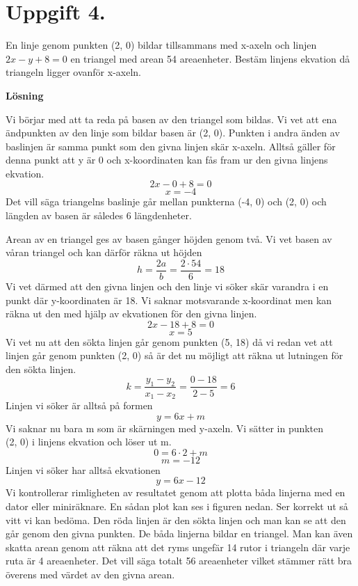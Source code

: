 \documentclass[fleqn]{article}
\begin{document}
\newpage
\section*{Uppgift 4.}
En linje genom punkten (2, 0) bildar tillsammans med x-axeln och linjen\\
 $2x-y+8=0$ en triangel med arean 54 areaenheter. Bestäm linjens ekvation då triangeln ligger ovanför x-axeln.

\textbf{Lösning}

Vi börjar med att ta reda på basen av den triangel som bildas. Vi vet att ena ändpunkten av den linje som bildar basen är (2, 0). Punkten i andra änden av baslinjen är samma punkt som den givna linjen skär x-axeln. Alltså gäller för denna punkt att y är 0 och x-koordinaten kan fås fram ur den givna linjens ekvation.
\[
2x - 0 + 8 = 0
\]
\[
x = -4
\]
Det vill säga triangelns baslinje går mellan punkterna (-4, 0) och (2, 0) och längden av basen är således 6 längdenheter.

Arean av en triangel ges av basen gånger höjden genom två. Vi vet basen av våran triangel och kan därför räkna ut höjden
\[
h = \dfrac{2a}{b} = \dfrac{2 \cdot 54}{6} = 18 
\]
Vi vet därmed att den givna linjen och den linje vi söker skär varandra i en punkt där y-koordinaten är 18. Vi saknar motsvarande x-koordinat men kan räkna ut den med hjälp av ekvationen för den givna linjen.
\[
2x - 18 + 8 = 0
\]
\[
x = 5
\]
Vi vet nu att den sökta linjen går genom punkten (5, 18) då vi redan vet att linjen går genom punkten (2, 0) så är det nu möjligt att räkna ut lutningen för den sökta linjen.
\[
k = \dfrac{y_1 - y_2}{x_1 - x_2} = \dfrac{0 - 18}{2 - 5} = 6
\]
Linjen vi söker är alltså på formen
\[
y = 6x + m
\]
Vi saknar nu bara m som är skärningen med y-axeln. Vi sätter in punkten\\
(2, 0) i linjens ekvation och löser ut m.
\[
0 = 6 \cdot 2 + m
\]
\[
m = -12
\]
Linjen vi söker har alltså ekvationen
\[
y = 6x - 12
\]
Vi kontrollerar rimligheten av resultatet genom att plotta båda linjerna med en dator eller miniräknare. En sådan plot kan ses i figuren nedan. Ser korrekt ut så vitt vi kan bedöma. Den röda linjen är den sökta linjen och man kan se att den går genom den givna punkten. De båda linjerna bildar en triangel. Man kan även skatta arean genom att räkna att det ryms ungefär 14 rutor i triangeln där varje ruta är 4 areaenheter. Det vill säga totalt 56 areaenheter vilket stämmer rätt bra överens med värdet av den givna arean.

\end{document}
